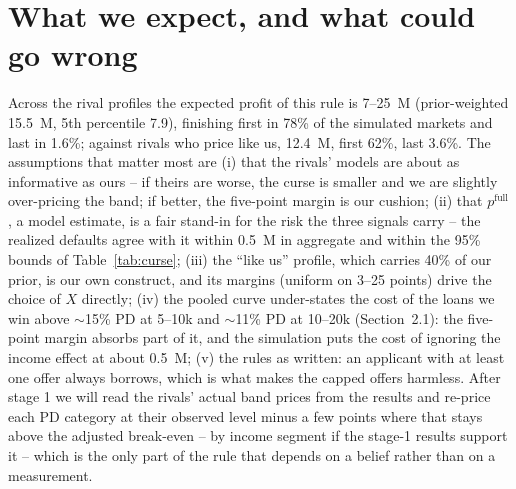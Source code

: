 \documentclass[11pt,a4paper]{article}
\newcommand{\meur}{M\texteuro}
\begin{document}
\section{What we expect, and what could go wrong}
Across the rival profiles the expected profit of this rule is 7--25~\meur{} (prior-weighted 15.5~\meur{}, 5th
percentile 7.9), finishing first in 78\% of the simulated markets and last in 1.6\%; against rivals who price like us,
12.4~\meur{}, first 62\%, last 3.6\%. The assumptions that matter most are (i) that the rivals' models are about as
informative as ours -- if theirs are worse, the curse is smaller and we are slightly over-pricing the band; if better, the
five-point margin is our cushion; (ii) that $p^{\text{full}}$, a model estimate, is a fair stand-in for the risk the three
signals carry -- the realized defaults agree with it within 0.5~\meur{} in aggregate and within the 95\% bounds of
Table~\ref{tab:curse}; (iii) the ``like us'' profile, which carries 40\% of our prior, is our own construct, and its
margins (uniform on 3--25 points) drive the choice of $X$ directly; (iv) the pooled curve under-states the cost of the
loans we win above $\sim$15\% PD at 5--10k and $\sim$11\% PD at 10--20k (Section~2.1): the five-point margin absorbs part
of it, and the simulation puts the cost of ignoring the income effect at about 0.5~\meur{}; (v) the rules as written: an
applicant with at least one offer always borrows, which is what makes the capped offers harmless. After stage 1 we will
read the rivals' actual band prices from the results and re-price each PD category at their observed level minus a few
points where that stays above the adjusted break-even -- by income segment if the stage-1 results support it -- which is
the only part of the rule that depends on a belief rather than on a measurement.
\end{document}
